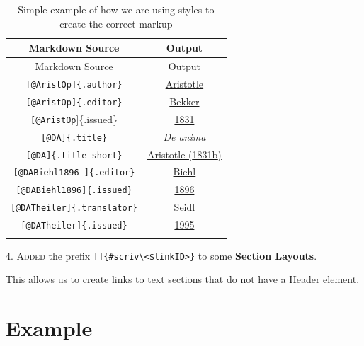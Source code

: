 \documentclass[
  12pt,
  a4paper,
  oneside]{scrbook}
\begin{document}
\hypertarget{tbl-cite-field-example}{}
\begin{longtable}[]{@{}cc@{}}
\toprule\noalign{}
Markdown Source & Output \\
\midrule\noalign{}
\endfirsthead
\toprule\noalign{}
Markdown Source & Output \\
\midrule\noalign{}
\endhead
\bottomrule\noalign{}
\endlastfoot
\texttt{{[}@AristOp{]}\{.author\}} &
\protect\hypertarget{cite_47}{}{\label{cite_47}\protect\hyperlink{ref-AristOp}{Aristotle}} \\
\texttt{{[}@AristOp{]}\{.editor\}} &
\protect\hypertarget{cite_48}{}{\label{cite_48}\protect\hyperlink{ref-AristOp}{Bekker}} \\
\texttt{{[}@AristOp}{]}\{.issued\} &
\protect\hypertarget{cite_49}{}{\label{cite_49}\protect\hyperlink{ref-AristOp}{1831}} \\
\texttt{{[}@DA{]}\{.title\}} &
\protect\hypertarget{cite_50}{}{\label{cite_50}\protect\hyperlink{ref-DA}{\emph{De anima}}} \\
\texttt{{[}@DA{]}\{.title-short\}} &
\protect\hypertarget{cite_52}{}{\label{cite_52}\protect\hyperlink{ref-DA}{{\protect\hypertarget{cite_51}{}{\label{cite_51}Aristotle
(\protect\hyperlink{ref-DA}{1831b})}}}} \\
\texttt{{[}@DABiehl1896\ {]}\{.editor\}} &
\protect\hypertarget{cite_53}{}{\label{cite_53}\protect\hyperlink{ref-DABiehl1896}{Biehl}} \\
\texttt{{[}@DABiehl1896{]}\{.issued\}} &
\protect\hypertarget{cite_54}{}{\label{cite_54}\protect\hyperlink{ref-DABiehl1896}{1896}} \\
\texttt{{[}@DATheiler{]}\{.translator\}} &
\protect\hypertarget{cite_55}{}{\label{cite_55}\protect\hyperlink{ref-DATheiler}{Seidl}} \\
\texttt{{[}@DATheiler{]}\{.issued\}} &
\protect\hypertarget{cite_56}{}{\label{cite_56}\protect\hyperlink{ref-DATheiler}{1995}} \\
\caption{\label{tbl-cite-field-example}Simple example of how we are
using styles to create the correct markup}\tabularnewline
\end{longtable}

\textsc{4. Added} the prefix
\texttt{{[}{]}\{\#scriv\textbackslash{}\textless{}\$linkID\textgreater{}\}}
to some \textbf{Section Layouts}.

This allows us to create links to \protect\hyperlink{scriv26}{text
sections that do not have a Header element}.

\hypertarget{example}{%
\section{Example}\label{example}}
\end{document}
